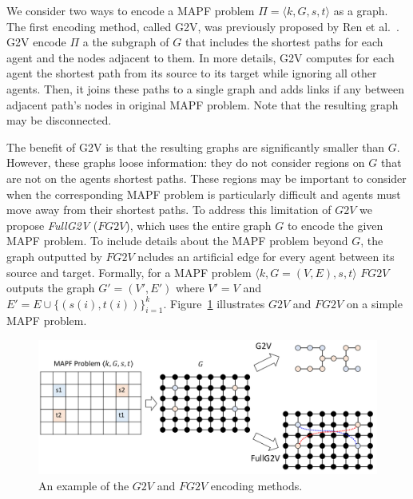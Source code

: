 \documentclass{ecai}
\newcommand{\tuple}[1]{\ensuremath{\langle #1\rangle}}
\newcommand{\Carmel}[1]{}
\newcommand{\Roni}[1]{}
\newcommand{\gtv}[1]{\ensuremath{\textit{G2V}}\xspace}
\newcommand{\fgtv}[1]{\ensuremath{\textit{FG2V}}\xspace}
\begin{document}
We consider two ways to encode a MAPF problem $\Pi=\tuple{k,G,s,t}$ as a graph. 
The first encoding method, called G2V, was previously proposed by Ren et al.~\cite{ren2021mapfast}.
G2V encode $\Pi$ a the subgraph of $G$ that includes the shortest paths for each agent and the nodes adjacent to them.
In more details, G2V computes for each agent the shortest path from its source to its target while ignoring all other agents. 
Then, it joins these paths to a single graph and adds links if any between adjacent path's nodes in original MAPF problem. 
Note that the resulting graph may be disconnected. 

The benefit of G2V is that the resulting graphs are significantly smaller than $G$. 
However, these graphs loose information: they do not consider regions on $G$ that are not on the agents shortest paths. 
These regions may be important to consider when the corresponding MAPF problem is particularly difficult and agents must move away from their shortest paths. 
To address this limitation of \gtv, we propose \emph{FullG2V} (\fgtv\ ), which uses the entire graph $G$ to encode the given MAPF problem. 
To include details about the MAPF problem beyond $G$, the graph outputted by \fgtv includes an artificial edge for every agent between its source and target. 
Formally, for a MAPF problem $\tuple{k,G=(V,E),s,t}$ \fgtv\ outputs the graph $G'=(V',E')$ where 
$V'=V$ and $E'=E\cup \{(s(i),t(i))\}_{i=1}^k$. Figure~\ref{fig:graph-encodings} illustrates \gtv\ and \fgtv\ on a simple MAPF problem. 

\begin{figure}
    \centering
    \includegraphics[width=\columnwidth]{Images/MAG-Diagram.pdf}
    \caption{An example of the \gtv\ and \fgtv\ encoding methods. \Carmel{G2V picture is wrong, we dont add nodes outside the shortest paths only add links if any, see my original picture... + it
joins these paths to a single graph and adds links if any between adja-
cent path’s nodes in original MAPF problem}}
    \label{fig:graph-encodings}
\end{figure}
\end{document}
